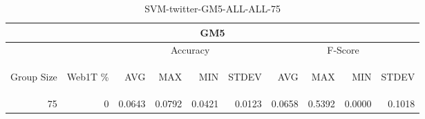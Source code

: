 \begin{center}
\begin{table}[htbp] 
 \begin{center}
\begin{tabular}{ | r | r | r | r | r | r | r | r | r | r |}
\hline
\multicolumn{10}{|c|}{GM5}\\
\hline
 & & \multicolumn{4}{|c|}{Accuracy} & \multicolumn{4}{|c|}{F-Score}\\ \cline{3-10}
\begin{sideways}Group Size\end{sideways} & \begin{sideways}Web1T \%\end{sideways} & \begin{sideways}AVG\end{sideways} & \begin{sideways}MAX\end{sideways} & \begin{sideways}MIN\end{sideways} & \begin{sideways}STDEV\end{sideways} & \begin{sideways}AVG\end{sideways} & \begin{sideways}MAX\end{sideways} & \begin{sideways}MIN\end{sideways} & \begin{sideways}STDEV\end{sideways}\\
\hline
\multirow{0}{*}{75}
 & 0 & 0.0643 & 0.0792 & 0.0421 & 0.0123 & 0.0658 & 0.5392 & 0.0000 & 0.1018\\ \cline{2-10}
\hline
\end{tabular}
\caption{SVM-twitter-GM5-ALL-ALL-75}
\label{table:SVM-twitter-GM5-ALL-ALL-75}
\end{center}
 \end{table}
\end{center}

